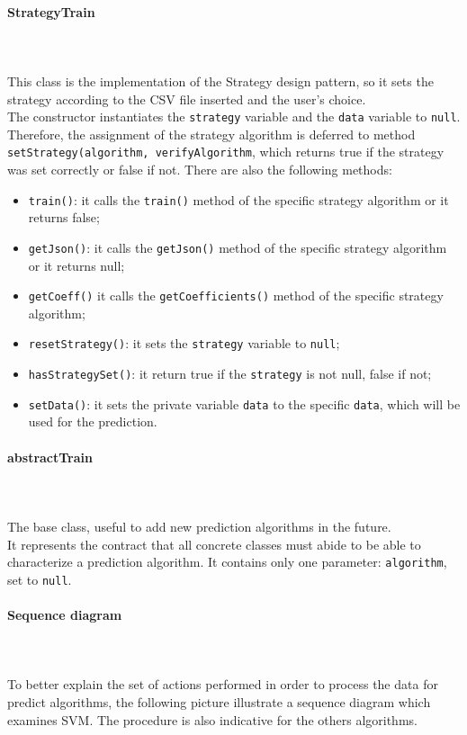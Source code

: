 \paragraph*{StrategyTrain}\mbox{} \\ \mbox{} \\
This class is the implementation of the Strategy design pattern, so it sets the strategy according to the CSV file inserted and the user's choice. \\
The constructor instantiates the \texttt{strategy} variable and the \texttt{data} variable to \texttt{null}. Therefore, the assignment of the strategy algorithm is deferred to method \texttt{setStrategy(algorithm, verifyAlgorithm}, which returns true if the strategy was set correctly or false if not. There are also the following methods: \begin{itemize}
\item \texttt{train()}: it calls the \texttt{train()} method of the specific strategy algorithm or it returns false;
\item \texttt{getJson()}: it calls the \texttt{getJson()} method of the specific strategy algorithm or it returns null;	
\item \texttt{getCoeff()} it calls the \texttt{getCoefficients()} method of the specific strategy algorithm;
\item \texttt{resetStrategy()}: it sets the \texttt{strategy} variable to \texttt{null};
\item \texttt{hasStrategySet()}: it return true if the \texttt{strategy} is not null, false if not;
\item \texttt{setData()}: it sets the private variable \texttt{data} to the specific \texttt{data}, which will be used for the prediction.
\end{itemize}

\paragraph*{abstractTrain}\mbox{} \\ \mbox{} \\
The base class, useful to add new prediction algorithms in the future. \\
It represents the contract that all concrete classes must abide to be able to characterize a prediction algorithm. It contains only one parameter: \texttt{algorithm}, set to \texttt{null}.

\paragraph*{Sequence diagram}\mbox{} \\ \mbox{} \\
To better explain the set of actions performed in order to process the data for
predict algorithms, the following picture illustrate a sequence diagram which examines SVM. The procedure is also indicative for the others algorithms.

